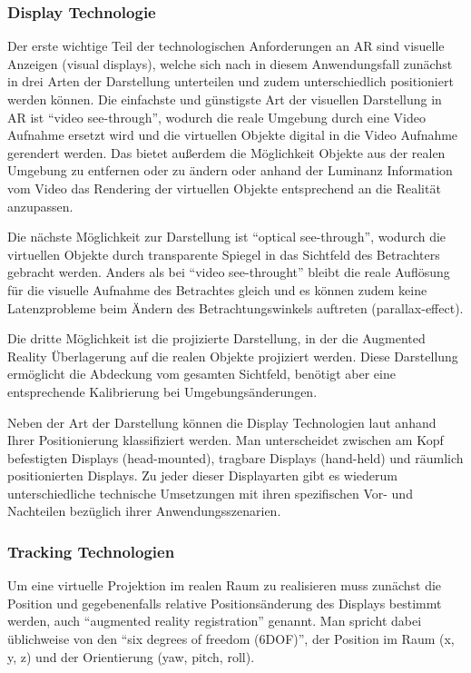 \subsubsection{Display Technologie}

Der erste wichtige Teil der technologischen Anforderungen an AR sind visuelle Anzeigen (visual displays), welche sich nach \citet{van2010survey}
in diesem Anwendungsfall zunächst in drei Arten der Darstellung unterteilen und zudem unterschiedlich positioniert werden können. Die einfachste und günstigste Art der visuellen Darstellung in AR ist \enquote{video see-through}, wodurch die reale Umgebung durch eine Video Aufnahme ersetzt wird und die virtuellen Objekte digital in die Video Aufnahme gerendert werden. Das bietet außerdem die Möglichkeit Objekte aus der realen Umgebung zu entfernen oder zu ändern oder anhand der Luminanz Information vom Video das Rendering der virtuellen Objekte entsprechend an die Realität anzupassen.

Die nächste Möglichkeit zur Darstellung ist \enquote{optical see-through}, wodurch die virtuellen Objekte durch transparente Spiegel in das Sichtfeld des Betrachters gebracht werden. Anders als bei \enquote{video see-throught} bleibt die reale Auflösung für die visuelle Aufnahme des Betrachtes gleich und es können zudem keine Latenzprobleme beim Ändern des Betrachtungswinkels auftreten (parallax-effect).

Die dritte Möglichkeit ist die projizierte Darstellung, in der die Augmented Reality Überlagerung auf die realen Objekte projiziert werden. Diese Darstellung ermöglicht die Abdeckung vom gesamten Sichtfeld, benötigt aber eine entsprechende Kalibrierung bei Umgebungsänderungen.

Neben der Art der Darstellung können die Display Technologien laut \citet{azuma2001recent} anhand Ihrer Positionierung klassifiziert werden. Man unterscheidet zwischen am Kopf befestigten Displays (head-mounted), tragbare Displays  (hand-held) und räumlich positionierten Displays. Zu jeder dieser Displayarten gibt es wiederum unterschiedliche technische Umsetzungen mit ihren spezifischen Vor- und Nachteilen bezüglich ihrer Anwendungsszenarien.

\subsubsection{Tracking Technologien}

Um eine virtuelle Projektion im realen Raum zu realisieren muss zunächst die Position und gegebenenfalls relative Positionsänderung des Displays bestimmt werden, auch \enquote{augmented reality registration} genannt. Man spricht dabei üblichweise von den \enquote{six degrees of freedom (6DOF)}, der Position im Raum (x, y, z) und der Orientierung (yaw, pitch, roll). 

